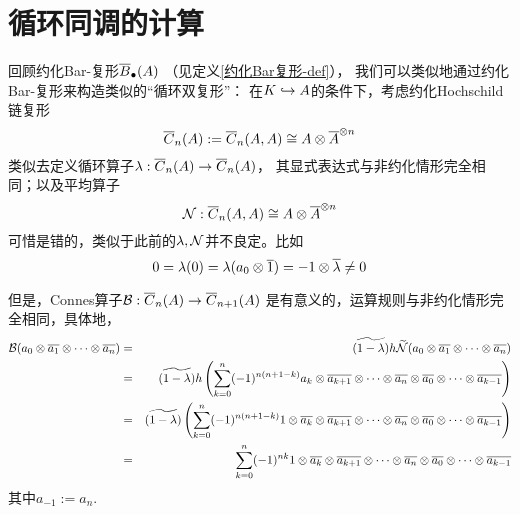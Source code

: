 

\section{循环同调的计算}


回顾约化Bar-复形$\overline{B}_{\bullet}(A)$
（见定义\ref{约化Bar复形-def}），
我们可以类似地通过约化Bar-复形来构造类似的“循环双复形”：
在$K\hookrightarrow A$的条件下，考虑约化Hochschild链复形
$$\overline{C}_n(A):=
\overline{C}_n(A,A)\cong A\otimes\overline{A}^{\otimes n}$$
{\color{gray}
类似去定义循环算子$\lambda:\overline{C}_n(A)\to\overline{C}_n(A)$，
其显式表达式与非约化情形完全相同；以及平均算子
$$\mathcal{N}:\overline{C}_n(A,A)\cong A\otimes\overline{A}^{\otimes n}$$
}
{\color{red}
可惜是错的，类似于此前的$\lambda,\mathcal{N}$并不良定。比如
$$0=\lambda(0)=\lambda(a_0\otimes \overline{1})=-1\otimes\overline{\lambda}\neq 0$$
}

但是，Connes算子$\mathcal{B}:\overline{C}_n(A)\to\overline{C}_{n+1}(A)$
是有意义的，运算规则与非约化情形完全相同，具体地，
\begin{eqnarray*}
    \mathcal{B}(a_0\otimes\overline{a_1}\otimes\cdots\otimes\overline{a_n})
&=& \widetilde{(1-\lambda)}h\widetilde{\mathcal{N}}
    (a_0\otimes\overline{a_1}\otimes\cdots\otimes\overline{a_n})\\
&=& \widetilde{(1-\lambda)}h
      \left(
        \sum_{k=0}^n(-1)^{n(n+1-k)}
          a_k\otimes \overline{a_{k+1}}\otimes\cdots\otimes\overline{a_n}
          \otimes\overline{a_0}\otimes\cdots\otimes\overline{a_{k-1}}
      \right)\\
&=&   \widetilde{(1-\lambda)}
      \left(
        \sum_{k=0}^n(-1)^{n(n+1-k)}
          1\otimes\overline{a_k}\otimes \overline{a_{k+1}}
          \otimes\cdots\otimes\overline{a_n}
          \otimes\overline{a_0}\otimes\cdots\otimes\overline{a_{k-1}}
      \right)\\
&=&   \sum_{k=0}^n(-1)^{nk}
        1\otimes\overline{a_k}\otimes \overline{a_{k+1}}
         \otimes\cdots\otimes\overline{a_n}
         \otimes\overline{a_0}\otimes\cdots\otimes\overline{a_{k-1}}
\end{eqnarray*}
其中$a_{-1}:=a_n$.


